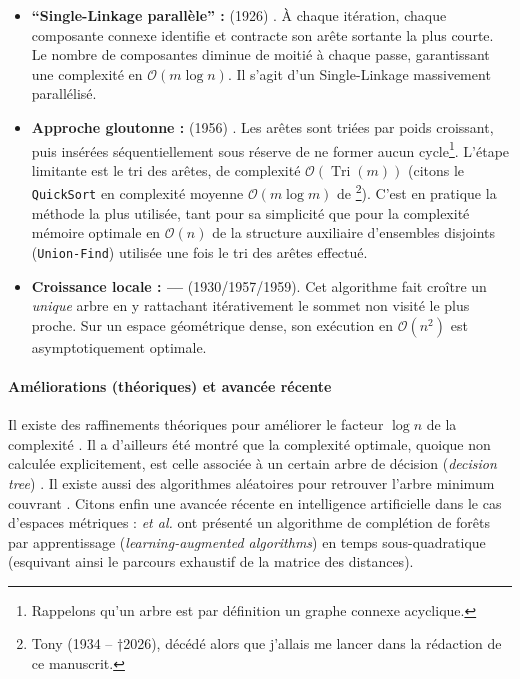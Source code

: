 \begin{itemize}
    \item \textbf{``Single-Linkage parallèle'' : } (1926) \cite{Boruvka1926}. À chaque itération, chaque composante connexe identifie et contracte son arête sortante la plus courte. Le nombre de composantes diminue de moitié à chaque passe, garantissant une complexité en $\mathcal{O}(m \log n)$. Il s'agit d'un Single-Linkage massivement parallélisé.

    \item \textbf{Approche gloutonne : } (1956) \cite{Kruskal1956}. Les arêtes sont triées par poids croissant, puis insérées séquentiellement sous réserve de ne former aucun cycle\footnote{Rappelons qu'un arbre est par définition un graphe connexe acyclique.}. L'étape limitante est le tri des arêtes, de complexité $\mathcal{O}(\operatorname{Tri}(m))$ (citons le \texttt{QuickSort} \cite{Hoare1962} en complexité moyenne $\mathcal O (m \log m)$ de \footnote{Tony  (1934 -- †2026), décédé alors que j'allais me lancer dans la rédaction de ce manuscrit.}). C'est en pratique la méthode la plus utilisée, tant pour sa simplicité que pour la complexité mémoire optimale en $\mathcal{O}(n)$ de la structure auxiliaire d'ensembles disjoints (\texttt{Union-Find}) \cite{Tarjan1975} utilisée une fois le tri des arêtes effectué.

    \item \textbf{Croissance locale : ----} (1930/1957/1959). Cet algorithme fait croître un \emph{unique} arbre en y rattachant itérativement le sommet non visité le plus proche. Sur un espace géométrique dense, son exécution en $\mathcal{O}(n^2)$ est asymptotiquement optimale.
\end{itemize}

\paragraph{Améliorations (théoriques) et avancée récente}
Il existe des raffinements théoriques pour améliorer le facteur $\log n$ de la complexité \cite{ChazelleMST}. Il a d'ailleurs été montré que la complexité optimale, quoique non calculée explicitement, est celle associée à un certain arbre de décision (\emph{decision tree}) \cite{OptimalMST2002}.
Il existe aussi des algorithmes aléatoires pour retrouver l'arbre minimum couvrant \cite{RandomizedMST}. 
Citons enfin une avancée récente en intelligence artificielle dans le cas d'espaces métriques :  \emph{et al.} \cite{Veldt2025} ont présenté un algorithme de complétion de forêts par apprentissage (\emph{learning-augmented algorithms}) en temps sous-quadratique (esquivant ainsi le parcours exhaustif de la matrice des distances).



